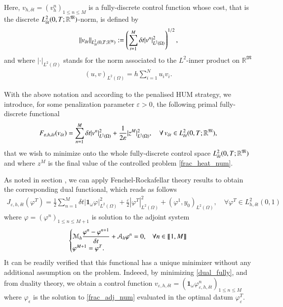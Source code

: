 Here, $v_{h,\delta t}=(v_h^n)_{1\leq n\leq M}$ is a fully-discrete control function whose cost, that is the discrete $L_{\delta t}^2(0,T;\mathbb R^{\mathfrak{M}})$-norm, is defined by
%
\begin{align*}
\|v_{\delta t}\|_{L_{\delta t}^2(0,T;\mathbb R^{\mathfrak{M}})}:=\left(\sum_{i=1}^M\delta t |v^n|^2_{L^2(\Omega)}\right)^{1/2},
\end{align*}
%
and where $| \cdot |_{L^2(\Omega)}$ stands for the norm associated to the $L^2$-inner product on $\mathbb{R}^\mathfrak M$
%
\begin{align*}
(u,v)_{L^2(\Omega)}=h \sum_{i=1}^N u_i v_i.
\end{align*}
%

With the above notation and according to the penalised HUM strategy, we introduce, for some penalization parameter $\varepsilon>0$, the following primal fully-discrete functional 
%
\begin{align*}
F_{\varepsilon,h,\delta t}(v_{\delta t})=\sum_{n=1}^{M}\delta t |v^n|^2_{L^2(\Omega)}+\frac{1}{2\varepsilon}|z^M|^2_{L^2(\Omega)}, \quad \forall \, v_{\delta t}\in L_{\delta t}^2(0,T;\mathbb R^{\mathfrak{M}}),
\end{align*}
%
that we wish to minimize onto the whole fully-discrete control space $L_{\delta t}^2(0,T;\mathbb R^{\mathfrak{M}})$ and where $z^M$ is the final value of the controlled problem \eqref{frac_heat_num}. 

As noted in section , we can apply Fenchel-Rockafellar theory results to obtain the corresponding dual functional, which reads as follows
%
\begin{align}\label{dual_fully}
	J_{\varepsilon,h,\delta t}(\varphi^T)=\frac{1}{2}\sum_{n=1}^{M}\delta t|\mathbf 1_\omega\varphi|^2_{L^2(\Omega)}+\frac{\varepsilon}{2}|\varphi^T|^2_{L^2(\Omega)}+(\varphi^1,y_0)_{L^2(\Omega)}, \quad \forall \varphi^T\in L_{h,\delta t}^2(0,1)
\end{align}
%
where $\varphi=(\varphi^n)_{1\leq n\leq M+1}$ is solution to the adjoint system
%
\begin{align}\label{frac_adj_num}
	\begin{cases}
		\displaystyle\mathcal M_h \frac{\varphi^n-\varphi^{n+1}}{\delta t}+\mathcal A_h \varphi^n=0, & \forall n\in\llbracket 1,M\rrbracket
		\\
		\varphi^{M+1}=\varphi^T. 
	\end{cases}
\end{align}
%
It can be readily verified that this functional has a unique minimizer without any additional assumption on the problem. Indeeed, by minimizing  \eqref{dual_fully}, and from duality theory, we obtain a control function $v_{\varepsilon,h,\delta t}=\left(\mathbf{1}_\omega\varphi_{\varepsilon,h,\delta t}^n\right)_{1\leq n\leq M}$ where $\varphi_\epsilon$ is the solution to \eqref{frac_adj_num} evaluated in the optimal datum $\varphi_\varepsilon^T$. 


